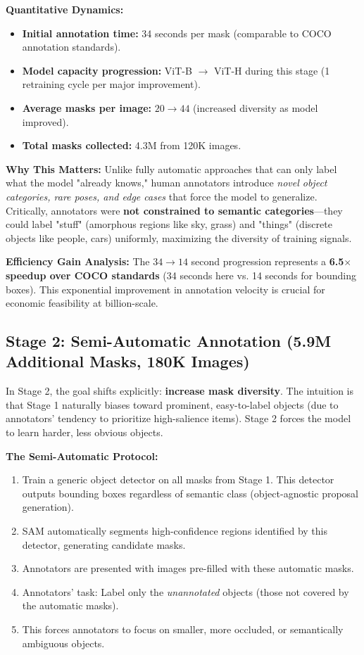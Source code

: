 \textbf{Quantitative Dynamics:}
\begin{itemize}
    \item \textbf{Initial annotation time:} 34 seconds per mask (comparable to COCO annotation standards).
    \item \textbf{Model capacity progression:} ViT-B $\rightarrow$ ViT-H during this stage (1 retraining cycle per major improvement).
    \item \textbf{Average masks per image:} $20 \rightarrow 44$ (increased diversity as model improved).
    \item \textbf{Total masks collected:} 4.3M from 120K images.
\end{itemize}

\textbf{Why This Matters:}
Unlike fully automatic approaches that can only label what the model "already knows," human annotators introduce \textit{novel object categories, rare poses, and edge cases} that force the model to generalize. Critically, annotators were \textbf{not constrained to semantic categories}—they could label "stuff" (amorphous regions like sky, grass) and "things" (discrete objects like people, cars) uniformly, maximizing the diversity of training signals.

\textbf{Efficiency Gain Analysis:}
The $34 \rightarrow 14$ second progression represents a \textbf{6.5$\times$ speedup over COCO standards} (34 seconds here vs. 14 seconds for bounding boxes). This exponential improvement in annotation velocity is crucial for economic feasibility at billion-scale.

\subsection{Stage 2: Semi-Automatic Annotation (5.9M Additional Masks, 180K Images)}
In Stage 2, the goal shifts explicitly: \textbf{increase mask diversity}. The intuition is that Stage 1 naturally biases toward prominent, easy-to-label objects (due to annotators' tendency to prioritize high-salience items). Stage 2 forces the model to learn harder, less obvious objects.

\textbf{The Semi-Automatic Protocol:}
\begin{enumerate}
    \item Train a generic object detector on all masks from Stage 1. This detector outputs bounding boxes regardless of semantic class (object-agnostic proposal generation).
    \item SAM automatically segments high-confidence regions identified by this detector, generating candidate masks.
    \item Annotators are presented with images pre-filled with these automatic masks.
    \item Annotators' task: Label only the \textit{unannotated} objects (those not covered by the automatic masks).
    \item This forces annotators to focus on smaller, more occluded, or semantically ambiguous objects.
\end{enumerate}

